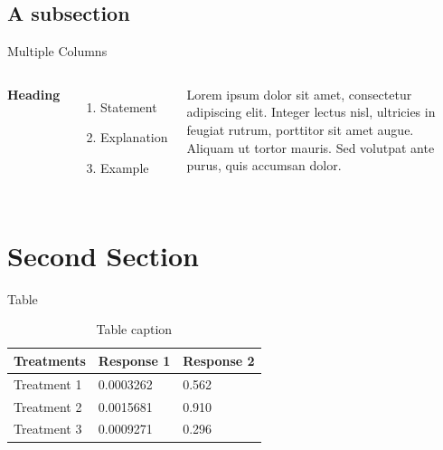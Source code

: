 \documentclass[12pt]{beamer}
\begin{document}

\subsection{A subsection}
\begin{frame}{Multiple Columns}
    \begin{columns}[c] %

        \textbf{Heading}
        \begin{enumerate}
            \item Statement
            \item Explanation
            \item Example
        \end{enumerate}

        Lorem ipsum dolor sit amet, consectetur adipiscing elit. Integer lectus nisl, ultricies in feugiat rutrum, porttitor sit amet augue. Aliquam ut tortor mauris. Sed volutpat ante purus, quis accumsan dolor.

    \end{columns}
\end{frame}

\section{Second Section}

\begin{frame}{Table}
    \begin{table}
        \begin{tabular}{l l l}
            \toprule
            \textbf{Treatments} & \textbf{Response 1} & \textbf{Response 2} \\
            \midrule
            Treatment 1         & 0.0003262           & 0.562               \\
            Treatment 2         & 0.0015681           & 0.910               \\
            Treatment 3         & 0.0009271           & 0.296               \\
            \bottomrule
        \end{tabular}
        \caption{Table caption}
    \end{table}
\end{frame}
\end{document}

